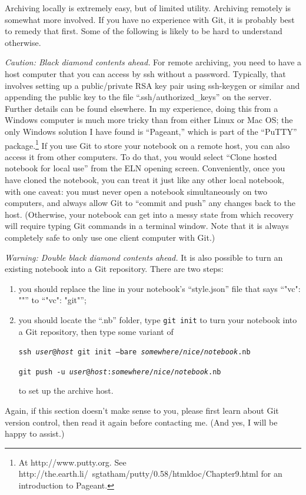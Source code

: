 \documentclass[11pt]{report}
\def\terminal#1{{\tt#1}}
\begin{document}
Archiving locally is extremely easy, but of limited utility. Archiving
remotely is somewhat more involved. If you have no experience with
Git, it is probably best to remedy that first. Some of the following
is likely to be hard to understand otherwise.

\emph{Caution: Black diamond contents ahead.} For remote archiving,
you need to have a host computer that you can access by ssh
without a password. Typically, that involves setting up a
public/private RSA key pair using ssh-keygen or similar and appending
the public key to the file ``.ssh/authorized\_keys'' on the
server. Further details can be found elsewhere. In my experience,
doing this from a Windows computer is much more tricky than from
either Linux or Mac OS; the only Windows solution I have found is
``Pageant,'' which is part of the ``PuTTY'' package.\footnote{At
http://www.putty.org. See
http://the.earth.li/~sgtatham/putty/0.58/htmldoc/Chapter9.html for an
introduction to Pageant.} If you use Git to store your notebook on a
remote host, you can also access it from other computers. To do that,
you would select ``Clone hosted notebook for local use'' from the ELN
opening screen. Conveniently, once you have cloned the notebook, you
can treat it just like any other local notebook, with one caveat: you
must never open a notebook simultaneously on two computers, and always
allow Git to ``commit and push'' any changes back to the
host. (Otherwise, your notebook can get into a messy state from which
recovery will require typing Git commands in a terminal
window. Note that it is always completely safe to only use one client
computer with Git.)

\emph{Warning: Double black diamond contents ahead.} It is also
possible to turn an existing notebook into a Git repository. There are
two steps:
\begin{enumerate}
  \item you should replace the line in your notebook's
    ``style.json'' file that says ``"vc": ""'' to ``"vc": "git"'';
    \item you
should locate the ``.nb'' folder, type \terminal{git init} to turn your
notebook into a Git repository, then type some variant of

\terminal{ssh
\emph{user}@\emph{host} git init --bare
\emph{somewhere}/\emph{nice}/\emph{notebook}.nb}\vspace{-5pt}

\terminal{git push -u
\emph{user}@\emph{host}:\emph{somewhere}/\emph{nice}/\emph{notebook}.nb}

to set up the archive host.
\end{enumerate}
Again, if this section doesn't make sense to you, please first learn
about Git version control, then read it again before
contacting me. (And yes, I will be happy to assist.)
\end{document}
